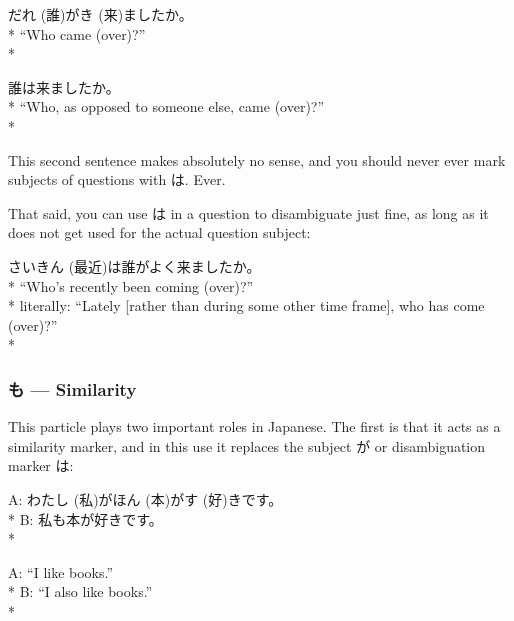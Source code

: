\documentclass[11pt, b5paper, twoside, openright, onecolumn]{book}
\makeatletter
\newcommand*{\rubystack}[2]{{\relscale{0.5}%
  \begin{tabular}[b]{@{}c@{}}%
    {#1}\\%
   {\textscale{2}{#2}}%
  \end{tabular}}%
}
\DeclareRobustCommand*{\ruby}[2]{%
  \mbox{%
    \setlength{\parskip}{0ex}%
    \BeginAccSupp{method=pdfstringdef,ActualText={#1}}%
      \rubystack{\phantom{#2}}{#1}%
      \llap{%
        \rubystack{#2}{\phantom{#1}}%
      }%
    \EndAccSupp{}%
  }%
}
\renewcommand*{\ruby}[2]{#2 (#1)}%
\newenvironment{exampleblock}{
\setlength{\parindent}{0.6in}
\begin{minipage}[t]{\dimexpr\textwidth-\parindent}}
{\end{minipage}}
\makeatother
\begin{document}
\vspace{0.4cm}
\begin{exampleblock}
\ruby{誰}{だれ}が\ruby{来}{き}ましたか。 \\* 
“Who came (over)?” \\* 
\end{exampleblock}
\vspace{0.2cm}

\begin{exampleblock}
誰は来ましたか。 \\* 
“Who‚ as opposed to someone else‚ came (over)?” \\* 
\end{exampleblock}
\vspace{0.2cm}

This second sentence makes absolutely no sense‚ and you should never ever mark subjects of questions with は. Ever.

That said‚ you can use は in a question to disambiguate just fine‚ as long as it does not get used for the actual question subject:

\vspace{0.4cm}
\begin{exampleblock}
\ruby{最近}{さいきん}は誰がよく来ましたか。 \\* 
“Who’s recently been coming (over)?” \\* 
literally: “Lately [rather than during some other time frame]‚ who has come (over)?” \\* 
\end{exampleblock}
\subsubsection{も — Similarity}


This particle plays two important roles in Japanese. The first is that it acts as a similarity marker‚ and in this use it replaces the subject が or disambiguation marker は:

\vspace{0.4cm}
\begin{exampleblock}
A: \ruby{私}{わたし}が\ruby{本}{ほん}が\ruby{好}{す}きです。 \\* 
B: 私も本が好きです。 \\* 
\end{exampleblock}
\vspace{0.2cm}

\begin{exampleblock}
A: “I like books.” \\* 
B: “I also like books.” \\* 
\end{exampleblock}
\vspace{0.2cm}
\end{document}
